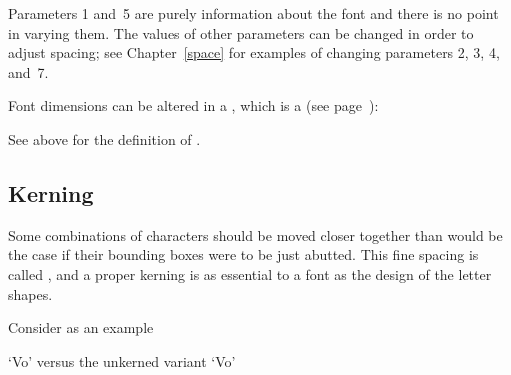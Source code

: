 Parameters 1 and~5 are purely information about the font
and there is no point in varying them.
The values of other parameters can be changed in order to
adjust spacing; see Chapter~\ref{space} for examples
of changing parameters 2, 3, 4, and~7.

Font dimensions can be altered in a , which is a  (see
page~\pageref{global:assign}):
\begin{Disp}
\end{Disp} See above for the definition of .

\subsection{Kerning}

Some combinations of characters should be moved closer
together than would be the case if their bounding boxes
were to be just abutted. This fine spacing is called ,
and a proper kerning is as essential to a font as the
design of the letter shapes.

Consider as an example
\begin{Disp} `Vo' versus the unkerned variant `V\hbox{}o'\end{Disp}

